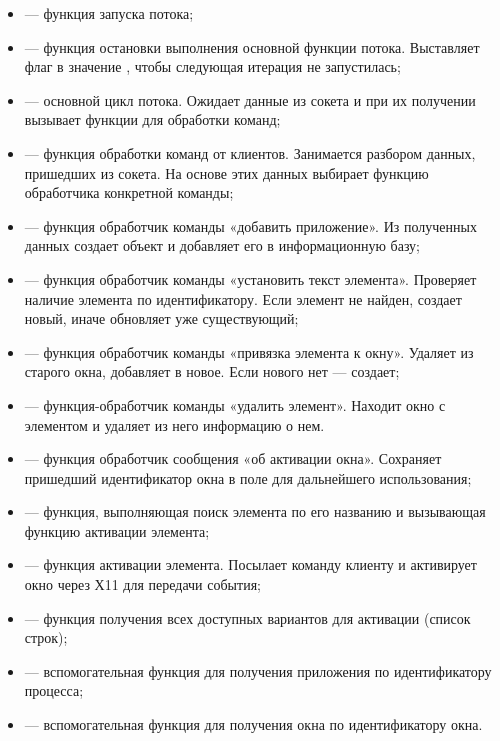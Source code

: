 \begin{itemize}
    \item {} — функция запуска потока;
    \item {} — функция остановки выполнения основной функции потока.
        Выставляет флаг  в значение , чтобы следующая
        итерация не запустилась;
    \item {} — основной цикл потока. Ожидает данные из сокета и при
        их получении вызывает функции для обработки команд;
    \item {} — функция обработки команд от клиентов.
        Занимается разбором данных, пришедших из сокета. На основе этих данных
        выбирает функцию обработчика конкретной команды;
    \item {} — функция обработчик команды «добавить
        приложение». Из полученных данных создает объект  и добавляет
        его в информационную базу;
    \item {} — функция обработчик команды «установить
        текст элемента». Проверяет наличие элемента по идентификатору. Если
        элемент не найден, создает новый, иначе обновляет уже существующий;
    \item {} — функция обработчик команды «привязка
        элемента к окну». Удаляет из старого окна, добавляет в новое. Если
        нового нет — создает;
    \item {} — функция-обработчик команды «удалить элемент».
        Находит окно с элементом и удаляет из него информацию о нем.
    \item {} — функция обработчик сообщения «об активации окна».
        Сохраняет пришедший идентификатор окна в поле 
        для дальнейшего использования;
    \item {} — функция, выполняющая поиск элемента по его
        названию и вызывающая функцию активации элемента;
    \item {} — функция активации элемента. Посылает
        команду клиенту и активирует окно через Х11 для передачи события;
    \item {} — функция получения всех доступных вариантов для
        активации (список строк);
    \item {} — вспомогательная функция для получения приложения
        по идентификатору процесса;
    \item {} — вспомогательная функция для получения
        окна по идентификатору окна.
\end{itemize}

